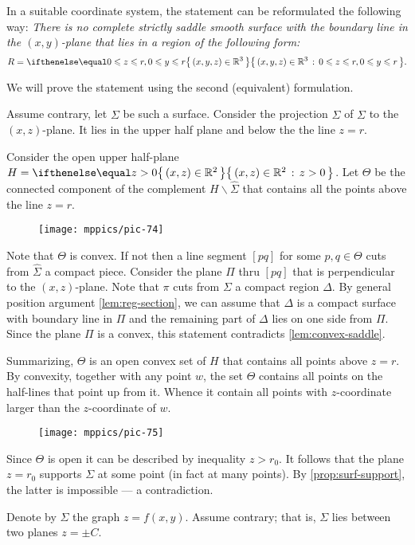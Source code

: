 In a suitable coordinate system, the statement can be reformulated the following way:
\emph{There is no complete strictly saddle smooth surface 
with the boundary line in the $(x,y)$-plane
that lies in a region of the following form:}
\[R=\set{(x,y,z)\in\RR^3}{0\le z\le r, 0\le y\le r}.\]

We will prove the statement using the second (equivalent) formulation.

Assume contrary, let $\Sigma$ be such a surface.
Consider the projection $\hat \Sigma$ of $\Sigma$ to the $(x,z)$-plane.
It lies in the upper half plane and below the the line $z=r$.

Consider the open upper half-plane $H=\set{(x,z)\in \RR^2}{z> 0}$. 
Let $\Theta$ be the connected component of the complement $H\backslash \hat \Sigma$ that contains all the points above the line $z=r$.

\begin{figure}[h!]
\vskip-0mm
\centering
\texttt{[image: mppics/pic-74]}
\vskip0mm
\end{figure}

Note that $\Theta$ is convex.
If not then a line segment $[pq]$ for some $p,q\in \Theta$ cuts from $\hat\Sigma$ a compact piece.
Consider the plane $\Pi$ thru $[pq]$ that is perpendicular to the $(x,z)$-plane.
Note that $\pi$ cuts from $\Sigma$ a compact region $\Delta$.
By general position argument \ref{lem:reg-section}, 
we can assume that $\Delta$ is a compact surface with boundary line in $\Pi$ and the remaining part of $\Delta$ lies on one side from $\Pi$.
Since the plane $\Pi$ is a convex, this statement contradicts \ref{lem:convex-saddle}.

Summarizing, $\Theta$ is an open convex set of $H$ that contains all points above $z=r$.
By convexity, together with any point $w$, the set $\Theta$ contains all points on the half-lines that point up from it. 
Whence it contain all points with $z$-coordinate larger than the $z$-coordinate of $w$.
\begin{figure}[h!]
\vskip-0mm
\centering
\texttt{[image: mppics/pic-75]}
\vskip0mm
\end{figure}
Since $\Theta$ is open it can be described by inequality $z>r_0$.
It follows that the plane $z=r_0$ supports $\Sigma$ at some point (in fact at many points).
By \ref{prop:surf-support}, the latter is impossible --- a contradiction.
\qeds

Denote by $\Sigma$ the graph $z=f(x,y)$.
Assume contrary; that is, $\Sigma$ lies between two planes $z=\pm C$.


